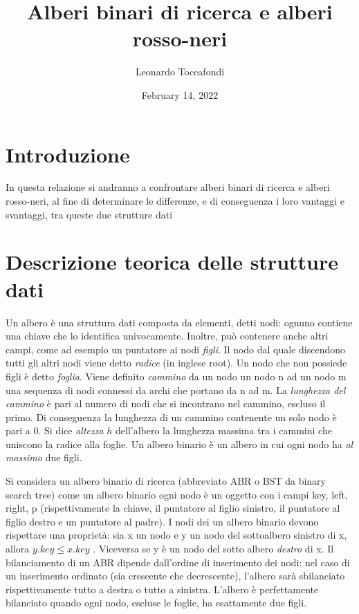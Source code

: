 \documentclass[
]{article}
\title{Alberi binari di ricerca e alberi rosso-neri}
\author{Leonardo Toccafondi}
\date{February 14, 2022}
\begin{document}
\maketitle

\hypertarget{introduzione}{%
\section{Introduzione}\label{introduzione}}

In questa relazione si andranno a confrontare alberi binari di ricerca e
alberi rosso-neri, al fine di determinare le differenze, e di
conseguenza i loro vantaggi e svantaggi, tra queste due strutture dati

\hypertarget{descrizione-teorica-delle-strutture-dati}{%
\section{Descrizione teorica delle strutture
dati}\label{descrizione-teorica-delle-strutture-dati}}

Un albero è una struttura dati composta da elementi, detti nodi: ognuno
contiene una chiave che lo identifica univocamente. Inoltre, può
contenere anche altri campi, come ad esempio un puntatore ai nodi
\emph{figli}. Il nodo dal quale discendono tutti gli altri nodi viene
detto \emph{radice} (in inglese root). Un nodo che non possiede figli è
detto \emph{foglia}. Viene definito \emph{cammino} da un nodo un nodo n
ad un nodo m una sequenza di nodi connessi da archi che portano da n ad
m. La \emph{lunghezza del cammino} è pari al numero di nodi che si
incontrano nel cammino, escluso il primo. Di conseguenza la lunghezza di
un cammino contenente un solo nodo è pari a 0. Si dice \emph{altezza}
\(h\) dell'albero la lunghezza massima tra i cammini che uniscono la
radice alla foglie. Un albero binario è un albero in cui ogni nodo ha
\emph{al massimo} due figli.

Si considera un albero binario di ricerca (abbreviato ABR o BST da
binary search tree) come un albero binario ogni nodo è un oggetto con i
campi key, left, right, p (rispettivamente la chiave, il puntatore al
figlio sinistro, il puntatore al figlio destro e un puntatore al padre).
I nodi dei un albero binario devono rispettare una proprietà: sia x un
nodo e y un nodo del sottoalbero sinistro di x, allora
\(y.key \leq x.key\) . Viceversa se y è un nodo del sotto albero
\emph{destro} di x. Il bilanciamento di un ABR dipende dall'ordine di
inserimento dei nodi: nel caso di un inserimento ordinato (sia crescente
che decrescente), l'albero sarà sbilanciato rispettivamente tutto a
destra o tutto a sinistra. L'albero è perfettamente bilanciato quando
ogni nodo, escluse le foglie, ha esattamente due figli.
\end{document}
